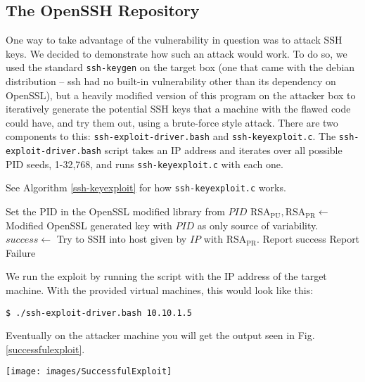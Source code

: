 \documentclass[conference]{IEEEtran}
\begin{document}
\subsection{The OpenSSH Repository}
One way to take advantage of the vulnerability in question was to
attack SSH keys. We decided to demonstrate how such an attack would
work. To do so, we used the standard \verb|ssh-keygen| on the target
box (one that came with the debian distribution -- ssh had no built-in
vulnerability other than its dependency on OpenSSL), but a heavily
modified version of this program on the attacker box to iteratively
generate the potential SSH keys that a machine with the flawed code
could have, and try them out, using a brute-force style attack. There
are two components to this: \verb|ssh-exploit-driver.bash| and
\verb|ssh-keyexploit.c|. The \verb|ssh-exploit-driver.bash| script
takes an IP address and iterates over all possible PID seeds,
1-32,768, and runs \verb|ssh-keyexploit.c| with each one.

See Algorithm \ref{ssh-keyexploit} for how \verb|ssh-keyexploit.c|
works.

\begin{algorithm}
  \caption{SSH key exploit}\label{ssh-keyexploit}

  \begin{algorithmic}[1]
    \State Set the PID in the OpenSSL modified library from $PID$
    \State $\mathrm{RSA}_{\mathrm{PU}}, \mathrm{RSA}_{\mathrm{PR}} \gets$ Modified OpenSSL generated key with $PID$ as only source of variability.
    \State $success \gets$ Try to SSH into host given by $IP$ with $\mathrm{RSA}_{\mathrm{PR}}$.
    \State Report success
    \Else
    \State Report Failure
    \EndIf
    \EndProcedure
  \end{algorithmic}
\end{algorithm}

We run the exploit by running the script with the IP address of the
target machine. With the provided virtual machines, this would look like this:

\begin{verbatim}
$ ./ssh-exploit-driver.bash 10.10.1.5
\end{verbatim}

Eventually on the attacker machine you will get the output seen in
Fig.\ref{successfulexploit}.

\begin{figure*}
  \centering
  \texttt{[image: images/SuccessfulExploit]}
  \caption{Console output of successful exploit}
  \label{successfulexploit}
\end{figure*}
\end{document}
